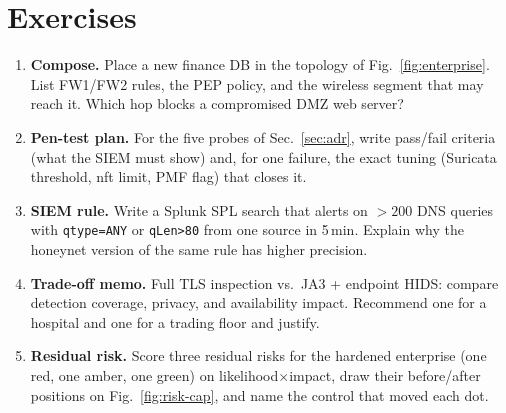 \section{Exercises}\label{sec:ch08-exercises}
\begin{enumerate}[label=E8.\arabic*, leftmargin=*, itemsep=0.6em]
    \item \textbf{Compose.} Place a new finance DB in the topology of Fig.~\ref{fig:enterprise}. List FW1/FW2 rules, the PEP policy, and the wireless segment that may reach it. Which hop blocks a compromised DMZ web server?
    \item \textbf{Pen-test plan.} For the five probes of Sec.~\ref{sec:adr}, write pass/fail criteria (what the SIEM must show) and, for one failure, the exact tuning (Suricata threshold, nft limit, PMF flag) that closes it.
    \item \textbf{SIEM rule.} Write a Splunk SPL search that alerts on $>200$ DNS queries with \texttt{qtype=ANY} or \texttt{qLen>80} from one source in 5\,min. Explain why the honeynet version of the same rule has higher precision.
    \item \textbf{Trade-off memo.} Full TLS inspection vs.\ JA3 + endpoint HIDS: compare detection coverage, privacy, and availability impact. Recommend one for a hospital and one for a trading floor and justify.
    \item \textbf{Residual risk.} Score three residual risks for the hardened enterprise (one red, one amber, one green) on likelihood$\times$impact, draw their before/after positions on Fig.~\ref{fig:risk-cap}, and name the control that moved each dot.
\end{enumerate}

